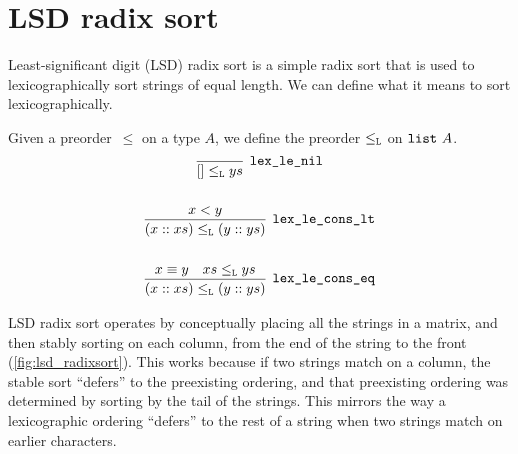 \documentclass[sigplan,10pt,anonymous,review]{thesis}
\begin{document}
\section{LSD radix sort}
\label{sec:radix_sort}

Least-significant digit (LSD) radix sort is a simple radix sort that
is used to lexicographically sort strings of equal length. We can
define what it means to sort lexicographically.

\begin{definition}[lex\_le]
  Given a preorder~$\le$ on a type $A$, we define the preorder $\le_{\texttt{\textup{L}}}$
  on $\texttt{\textup{list}}~A$.
  \begin{gather*}
    \infer[\var{lex\_le\_nil}]{[] \lexle ys}{}
    \\
    \\
    \infer[\var{lex\_le\_cons\_lt}]{(x :: xs) \lexle (y :: ys)}{%
      x < y
    }
    \\
    \\
    \infer[\var{lex\_le\_cons\_eq}]{(x :: xs) \lexle (y :: ys)}{%
      x \equiv y & xs \lexle ys
    }
  \end{gather*}
\end{definition}

LSD radix sort operates by conceptually placing all the strings in a
matrix, and then stably sorting on each column, from the end of the
string to the front (\cref{fig:lsd_radixsort}). This works because if
two strings match on a column, the stable sort ``defers'' to the
preexisting ordering, and that preexisting ordering was determined by
sorting by the tail of the strings. This mirrors the way a
lexicographic ordering ``defers'' to the rest of a string when two
strings match on earlier characters.
\end{document}
